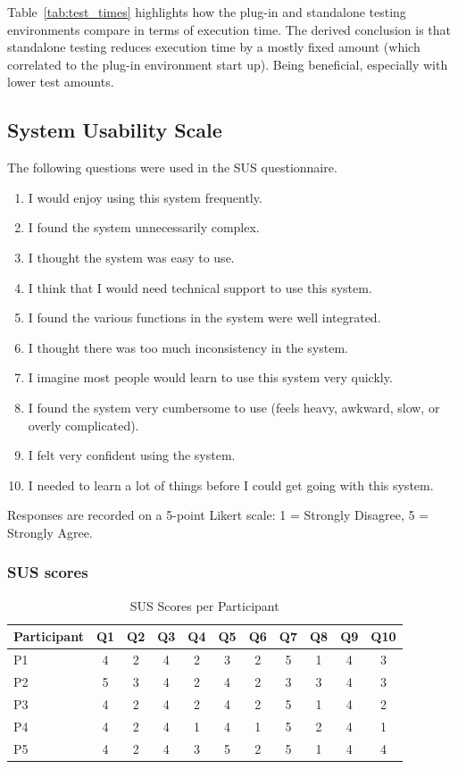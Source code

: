 Table~\ref{tab:test_times} highlights how the plug-in and standalone testing environments compare in terms of execution time. The derived conclusion is that standalone testing reduces execution time by a mostly fixed amount (which correlated to the plug-in environment start up). Being beneficial, especially with lower test amounts.

\subsection{System Usability Scale}
\label{app:sus}

The following questions were used in the \gls{SUS} questionnaire.

\begin{enumerate}
	\item I would enjoy using this system frequently.
	\item I found the system unnecessarily complex.
	\item I thought the system was easy to use.
	\item I think that I would need technical support to use this system.
	\item I found the various functions in the system were well integrated.
	\item I thought there was too much inconsistency in the system.
	\item I imagine most people would learn to use this system very quickly.
	\item I found the system very cumbersome to use (feels heavy, awkward, slow, or overly complicated).
	\item I felt very confident using the system.
	\item I needed to learn a lot of things before I could get going with this system.
\end{enumerate}

Responses are recorded on a 5-point Likert scale:
1 = Strongly Disagree, 5 = Strongly Agree.

\subsubsection{\gls{SUS} scores}
\label{app:sus_scores}

\begin{table}[htbp]
	\centering
	\caption{\gls{SUS} Scores per Participant}
	\label{tab:sus_scores_appendix}
	\begin{tabular}{l c c c c c c c c c c}
		\toprule
		Participant & Q1 & Q2 & Q3 & Q4 & Q5 & Q6 & Q7 & Q8 & Q9 & Q10 \\
		\midrule
		P1 & 4 & 2 & 4 & 2 & 3 & 2 & 5 & 1 & 4 & 3 \\
		P2 & 5 & 3 & 4 & 2 & 4 & 2 & 3 & 3 & 4 & 3 \\
		P3 & 4 & 2 & 4 & 2 & 4 & 2 & 5 & 1 & 4 & 2 \\
		P4 & 4 & 2 & 4 & 1 & 4 & 1 & 5 & 2 & 4 & 1 \\
		P5 & 4 & 2 & 4 & 3 & 5 & 2 & 5 & 1 & 4 & 4 \\
		\bottomrule
	\end{tabular}
\end{table}

